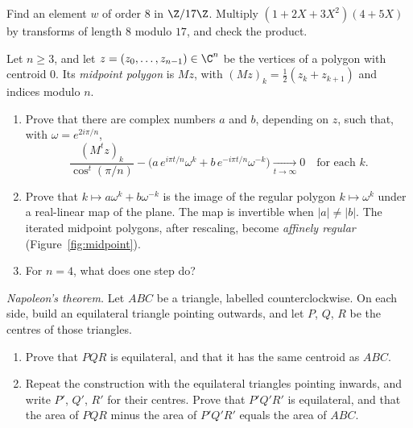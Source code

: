 \begin{exercise}[$\star\star$]\label{ex:nttsmall}
Find an element $w$ of order $8$ in $\Z/17\Z$. Multiply $(1+2X+3X^2)(4+5X)$ by transforms of length $8$ modulo $17$, and check the product.
\end{exercise}

\begin{exercise}[$\star\star$]\label{pb:midpoint}
Let $n\ge3$, and let $z=(z_0,\dots,z_{n-1})\in\C^n$ be the vertices of a polygon with centroid $0$. Its \emph{midpoint polygon} is $Mz$, with $(Mz)_k=\frac12(z_k+z_{k+1})$ and indices modulo $n$.
\begin{enumerate}[label=(\alph*)]
\item Prove that there are complex numbers $a$ and $b$, depending on $z$, such that, with $\omega=e^{2i\pi/n}$,
\[
\frac{(M^tz)_k}{\cos^t(\pi/n)}-\bigl(a\,e^{i\pi t/n}\omega^k+b\,e^{-i\pi t/n}\omega^{-k}\bigr)\xrightarrow[t\to\infty]{}0
\quad\text{for each }k.
\]
\item Prove that $k\mapsto a\omega^k+b\omega^{-k}$ is the image of the regular polygon $k\mapsto\omega^k$ under a real-linear map of the plane. The map is invertible when $|a|\ne|b|$. The iterated midpoint polygons, after rescaling, become \emph{affinely regular} (Figure~\ref{fig:midpoint}).
\item For $n=4$, what does one step do?
\end{enumerate}
\end{exercise}

\begin{exercise}[$\star\star$]\label{pb:napoleon}
\emph{Napoleon's theorem.} Let $ABC$ be a triangle, labelled counterclockwise. On each side, build an equilateral triangle pointing outwards, and let $P$, $Q$, $R$ be the centres of those triangles.
\begin{enumerate}[label=(\alph*)]
\item Prove that $PQR$ is equilateral, and that it has the same centroid as $ABC$.
\item Repeat the construction with the equilateral triangles pointing inwards, and write $P'$, $Q'$, $R'$ for their centres. Prove that $P'Q'R'$ is equilateral, and that the area of $PQR$ minus the area of $P'Q'R'$ equals the area of $ABC$.
\end{enumerate}
\end{exercise}

